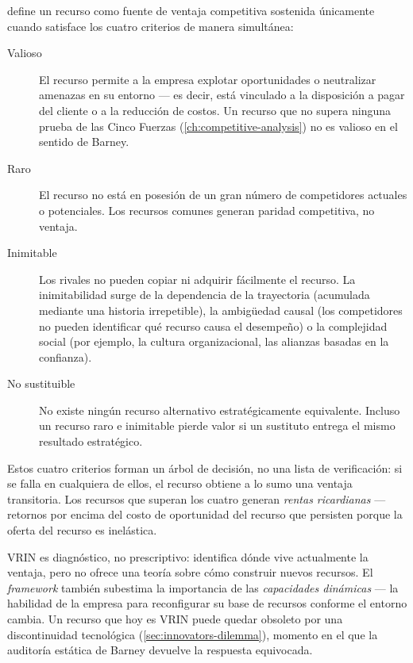 \textcite{barney1991resource} define un recurso como fuente de ventaja competitiva sostenida
únicamente cuando satisface los cuatro criterios de manera simultánea:
\begin{description}
  \item[Valioso] El recurso permite a la empresa explotar oportunidades o neutralizar amenazas
        en su entorno --- es decir, está vinculado a la disposición a pagar del cliente o a la
        reducción de costos. Un recurso que no supera ninguna prueba de las Cinco Fuerzas
        (\cref{ch:competitive-analysis}) no es valioso en el sentido de Barney.
  \item[Raro] El recurso no está en posesión de un gran número de competidores actuales o
        potenciales. Los recursos comunes generan paridad competitiva, no ventaja.
  \item[Inimitable] Los rivales no pueden copiar ni adquirir fácilmente el recurso. La
        inimitabilidad surge de la dependencia de la trayectoria (acumulada mediante una historia
        irrepetible), la ambigüedad causal (los competidores no pueden identificar qué recurso
        causa el desempeño) o la complejidad social (por ejemplo, la cultura organizacional,
        las alianzas basadas en la confianza).
  \item[No sustituible] No existe ningún recurso alternativo estratégicamente equivalente.
        Incluso un recurso raro e inimitable pierde valor si un sustituto entrega el mismo
        resultado estratégico.
\end{description}
Estos cuatro criterios forman un árbol de decisión, no una lista de verificación: si se falla
en cualquiera de ellos, el recurso obtiene a lo sumo una ventaja transitoria. Los recursos que
superan los cuatro generan \emph{rentas ricardianas} --- retornos por encima del costo de
oportunidad del recurso que persisten porque la oferta del recurso es inelástica.

VRIN es diagnóstico, no prescriptivo: identifica dónde vive actualmente la ventaja, pero no
ofrece una teoría sobre cómo construir nuevos recursos. El \emph{framework} también subestima
la importancia de las \emph{capacidades dinámicas} --- la habilidad de la empresa para
reconfigurar su base de recursos conforme el entorno cambia. Un recurso que hoy es VRIN puede
quedar obsoleto por una discontinuidad tecnológica (\cref{sec:innovators-dilemma}), momento en
el que la auditoría estática de Barney devuelve la respuesta equivocada.

